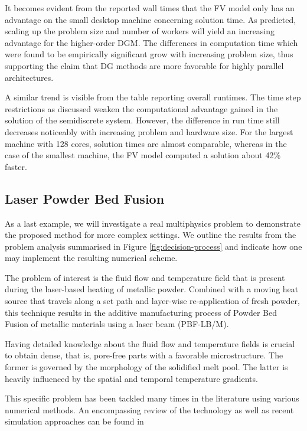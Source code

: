 \documentclass[asi,article,submit,moreauthors]{Definitions/mdpi}
\begin{document}
It becomes evident from the reported wall times that the FV model only has an advantage on the small desktop machine concerning solution time.
As predicted, scaling up the problem size and number of workers will yield an increasing advantage for the higher-order DGM.
The differences in computation time which were found to be empirically significant grow with increasing problem size, thus supporting the claim that DG methods are more favorable for highly parallel architectures.

A similar trend is visible from the table reporting overall runtimes.
The time step restrictions as discussed weaken the computational advantage gained in the solution of the semidiscrete system.
However, the difference in run time still decreases noticeably with increasing problem and hardware size.
For the largest machine with 128 cores, solution times are almost comparable, whereas in the case of the smallest machine, the FV model computed a solution about 42\% faster.

\subsection{Laser Powder Bed Fusion}

As a last example, we will investigate a real multiphysics problem to demonstrate the proposed method for more complex settings.
We outline the results from the problem analysis summarised in Figure \ref{fig:decision-process} and indicate how one may implement the resulting numerical scheme.

The problem of interest is the fluid flow and temperature field that is present during the laser-based heating of metallic powder.
Combined with a moving heat source that travels along a set path and layer-wise re-application of fresh powder, this technique results in the additive manufacturing process of Powder Bed Fusion of metallic materials using a laser beam (PBF-LB/M).

Having detailed knowledge about the fluid flow and temperature fields is crucial to obtain dense, that is, pore-free parts with a favorable microstructure.
The former is governed by the morphology of the solidified melt pool. The latter is heavily influenced by the spatial and temporal temperature gradients.

This specific problem has been tackled many times in the literature using various numerical methods.
An encompassing review of the technology as well as recent simulation approaches can be found in \cite{chowdhuryLaserPowderBed2022}
\end{document}
